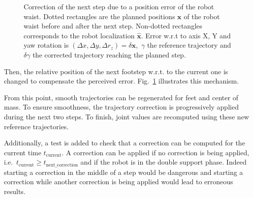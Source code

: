 \begin{figure}[ht!]
\begin{center}
  \end{center}
  \caption{Correction of the next step due to a position error of the
    robot waist. Dotted rectangles are the planned positions
    $\mathbf{x}$ of the robot waist before and after the next
    step. Non-dotted rectangles corresponds to the robot localization
    $\mathbf{\hat{x}}$. Error w.r.t to axis X, Y and yaw rotation is
    \mbox{$(\Delta x, \Delta y, \Delta r_z) = \delta \mathbf{x}$,
      $\gamma$} the reference trajectory and $\delta \gamma$ the
    corrected trajectory reaching the planned
    step. \label{fig:footstepreplan}}
\end{figure}



Then, the relative position of the next footstep w.r.t. to the current
one is changed to compensate the perceived
error. Fig.~\ref{fig:footstepreplan} illustrates this mechanism.


From this point, smooth trajectories can be regenerated for feet and
center of mass. To ensure smoothness, the trajectory correction is
progressively applied during the next two steps. To finish, joint
values are recomputed using these new reference trajectories.



Additionally, a test is added to check that a correction can be
computed for the current time $t_{\text{current}}$. A correction can
be applied if no correction is being applied,
i.e.\ \mbox{$t_{\text{current}} \geq t_{\text{next\_correction}}$} and if the
robot is in the double support phase. Indeed starting a correction in
the middle of a step would be dangerous and starting a correction
while another correction is being applied would lead to erroneous
results.


